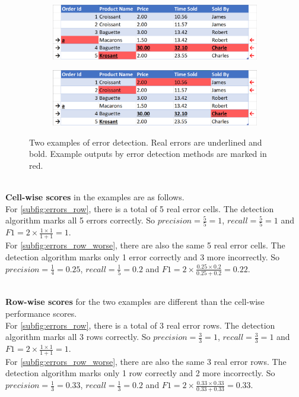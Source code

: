 \begin{figure}[h]
\centering
    \begin{subfigure}{0.9\textwidth}
        \includegraphics[width=\linewidth]{thesis/Figures/Method/Errors_dataset_F1_row.png}
        \caption{}
        \label{subfig:errors_row}
    \end{subfigure}
    \begin{subfigure}{0.9\textwidth}
        \includegraphics[width=\linewidth]{thesis/Figures/Method/Errors_dataset_Worse_F1_row.png}
        \caption{}
        \label{subfig:errors_row_worse}
    \end{subfigure}
    \caption{Two examples of error detection. Real errors are underlined and bold. Example outputs by error detection methods are marked in red.}
    \label{fig:error_row_wise}
\end{figure}

~\\\textbf{Cell-wise scores} in the examples are as follows. 
\\For \autoref{subfig:errors_row}, there is a total of 5 real error cells. The detection algorithm marks all 5 errors correctly. So $precision = \frac{5}{5} = 1$, $recall = \frac{5}{5} = 1$ and $F1 = 2 \times \frac{1 \times 1}{1 + 1} = 1$. 
\\For \autoref{subfig:errors_row_worse}, there are also the same 5 real error cells. The detection algorithm marks only 1 error correctly and 3 more incorrectly. So $precision = \frac{1}{4} = 0.25$, $recall = \frac{1}{5} = 0.2$ and $F1 = 2 \times \frac{0.25 \times 0.2}{0.25 + 0.2} = 0.22$. 

~\\\textbf{Row-wise scores} for the two examples are different than the cell-wise performance scores.
\\For \autoref{subfig:errors_row}, there is a total of 3 real error rows. The detection algorithm marks all 3 rows correctly. So $precision = \frac{3}{3} = 1$, $recall = \frac{3}{3} = 1$ and $F1 = 2 \times \frac{1 \times 1}{1 + 1} = 1$. 
\\For \autoref{subfig:errors_row_worse}, there are also the same 3 real error rows. The detection algorithm marks only 1 row correctly and 2 more incorrectly. So $precision = \frac{1}{3} = 0.33$, $recall = \frac{1}{3} = 0.2$ and $F1 = 2 \times \frac{0.33 \times 0.33}{0.33 + 0.33} = 0.33$. 

